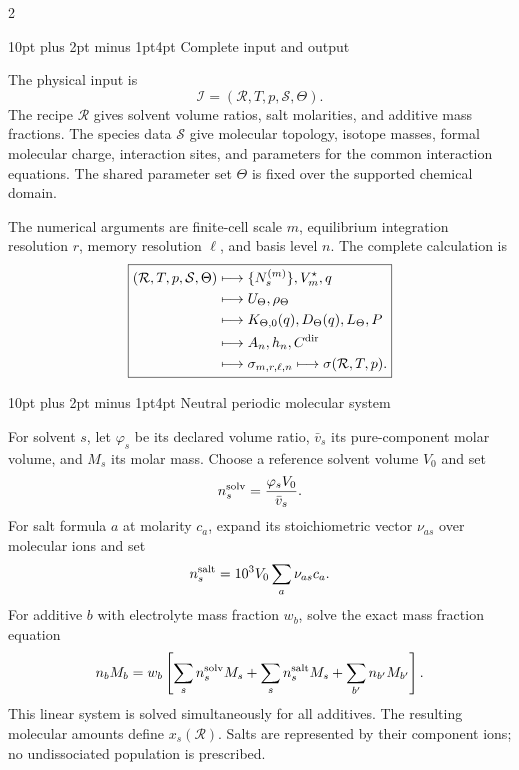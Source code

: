 \documentclass[10pt]{article}
\makeatletter
\renewcommand\section{\@startsection{section}{1}{0pt}%
  {10pt plus 2pt minus 1pt}{4pt}%
  {\large\sffamily\bfseries\color{lithioxfontgreen}}}
\makeatother
\begin{document}
\vspace{0.3cm}
\begin{multicols}{2}
\RaggedRight\raggedcolumns

\section{Complete input and output}

The physical input is
\[
\mathcal I=(\mathcal R,T,p,\mathcal S,\Theta).
\]
The recipe \(\mathcal R\) gives solvent volume ratios, salt molarities, and additive
mass fractions. The species data \(\mathcal S\) give molecular topology, isotope
masses, formal molecular charge, interaction sites, and parameters for the common
interaction equations. The shared parameter set \(\Theta\) is fixed over the supported
chemical domain.

The numerical arguments are finite-cell scale \(m\), equilibrium integration
resolution \(r\), memory resolution \(\ell\), and basis level \(n\). The complete
calculation is
\[
\boxed{\begin{aligned}
(\mathcal R,T,p,\mathcal S,\Theta)
&\longmapsto \{N_s^{(m)}\},V_m^\star,q\\
&\longmapsto U_\Theta,\rho_\Theta\\
&\longmapsto K_{\Theta,0}(q),D_\Theta(q),L_\Theta,P\\
&\longmapsto A_n,h_n,C^{\rm dir}\\
&\longmapsto \sigma_{m,r,\ell,n}
\longmapsto \sigma(\mathcal R,T,p).
\end{aligned}}
\]

\section{Neutral periodic molecular system}

For solvent \(s\), let \(\varphi_s\) be its declared volume ratio,
\(\bar v_s\) its pure-component molar volume, and \(M_s\) its molar mass.  Choose a
reference solvent volume \(V_0\) and set
\[
n_s^{\rm solv}=\frac{\varphi_sV_0}{\bar v_s}.
\]
For salt formula \(a\) at molarity \(c_a\), expand its stoichiometric vector
\(\nu_{as}\) over molecular ions and set
\[
n_s^{\rm salt}=10^3V_0\sum_a\nu_{as}c_a .
\]
For additive \(b\) with electrolyte mass fraction \(w_b\), solve the exact mass
fraction equation
\[
n_bM_b=w_b\left[
\sum_sn_s^{\rm solv}M_s+\sum_sn_s^{\rm salt}M_s+\sum_{b'}n_{b'}M_{b'}
\right].
\]
This linear system is solved simultaneously for all additives.  The resulting
molecular amounts define \(x_s(\mathcal R)\).  Salts are represented by their
component ions; no undissociated population is prescribed.


\end{multicols}
\end{document}
